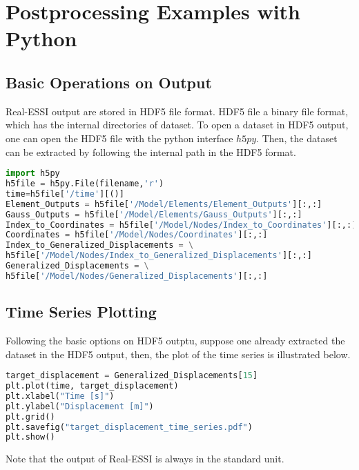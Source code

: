 \chapter{Postprocessing Examples with Python}
\label{ch-post processing}


\section{Basic Operations on Output }

Real-ESSI output are stored in HDF5 file format. 
HDF5 file a binary file format, which has the internal directories of dataset.
To open a dataset in HDF5 output, one can open the HDF5 file with the python interface $h5py$.
Then, the dataset can be extracted by following the internal path in the HDF5 format.

\begin{lstlisting}[frame=single, language=Python]
import h5py
h5file = h5py.File(filename,'r')
time=h5file['/time'][()]
Element_Outputs = h5file['/Model/Elements/Element_Outputs'][:,:]
Gauss_Outputs = h5file['/Model/Elements/Gauss_Outputs'][:,:]
Index_to_Coordinates = h5file['/Model/Nodes/Index_to_Coordinates'][:,:]
Coordinates = h5file['/Model/Nodes/Coordinates'][:,:]
Index_to_Generalized_Displacements = \
h5file['/Model/Nodes/Index_to_Generalized_Displacements'][:,:]
Generalized_Displacements = \
h5file['/Model/Nodes/Generalized_Displacements'][:,:]
\end{lstlisting}

\section{Time Series Plotting}
Following the basic options on HDF5 outptu, suppose one already extracted the dataset
in the HDF5 output, then, the plot of the time series is illustrated below.
\begin{lstlisting}[frame=single, language=Python]
target_displacement = Generalized_Displacements[15]
plt.plot(time, target_displacement)
plt.xlabel("Time [s]")
plt.ylabel("Displacement [m]")
plt.grid()
plt.savefig("target_displacement_time_series.pdf")
plt.show()
\end{lstlisting}
Note that the output of Real-ESSI is always in the standard unit.

